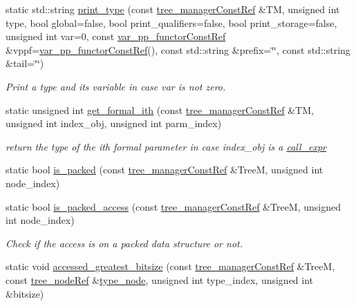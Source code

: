 \begin{DoxyCompactItemize}
static std\+::string \hyperlink{classtree__helper_ae3199a84c9560139e1bbbaf3b5b1e519}{print\+\_\+type} (const \hyperlink{tree__manager_8hpp_a792e3f1f892d7d997a8d8a4a12e39346}{tree\+\_\+manager\+Const\+Ref} \&TM, unsigned int type, bool global=false, bool print\+\_\+qualifiers=false, bool print\+\_\+storage=false, unsigned int var=0, const \hyperlink{var__pp__functor_8hpp_a8a6b51b6519401d911398943510557f0}{var\+\_\+pp\+\_\+functor\+Const\+Ref} \&vppf=\hyperlink{var__pp__functor_8hpp_a8a6b51b6519401d911398943510557f0}{var\+\_\+pp\+\_\+functor\+Const\+Ref}(), const std\+::string \&prefix=\char`\"{}\char`\"{}, const std\+::string \&tail=\char`\"{}\char`\"{})
\begin{DoxyCompactList}\small\item\em Print a type and its variable in case var is not zero. \end{DoxyCompactList}\item 
static unsigned int \hyperlink{classtree__helper_ab167a6cf8665fcf9f50a007f94dc0048}{get\+\_\+formal\+\_\+ith} (const \hyperlink{tree__manager_8hpp_a792e3f1f892d7d997a8d8a4a12e39346}{tree\+\_\+manager\+Const\+Ref} \&TM, unsigned int index\+\_\+obj, unsigned int parm\+\_\+index)
\begin{DoxyCompactList}\small\item\em return the type of the ith formal parameter in case index\+\_\+obj is a \hyperlink{structcall__expr}{call\+\_\+expr} \end{DoxyCompactList}\item 
static bool \hyperlink{classtree__helper_abc76c244562398090b0f0341d0f92dae}{is\+\_\+packed} (const \hyperlink{tree__manager_8hpp_a792e3f1f892d7d997a8d8a4a12e39346}{tree\+\_\+manager\+Const\+Ref} \&TreeM, unsigned int node\+\_\+index)
\item 
static bool \hyperlink{classtree__helper_ae706d20dd7fa5cc5d33649877084622b}{is\+\_\+packed\+\_\+access} (const \hyperlink{tree__manager_8hpp_a792e3f1f892d7d997a8d8a4a12e39346}{tree\+\_\+manager\+Const\+Ref} \&TreeM, unsigned int node\+\_\+index)
\begin{DoxyCompactList}\small\item\em Check if the access is on a packed data structure or not. \end{DoxyCompactList}\item 
static void \hyperlink{classtree__helper_a4bb90d532741ab00cea548b765e0f420}{accessed\+\_\+greatest\+\_\+bitsize} (const \hyperlink{tree__manager_8hpp_a792e3f1f892d7d997a8d8a4a12e39346}{tree\+\_\+manager\+Const\+Ref} \&TreeM, const \hyperlink{tree__node_8hpp_a6ee377554d1c4871ad66a337eaa67fd5}{tree\+\_\+node\+Ref} \&\hyperlink{structtype__node}{type\+\_\+node}, unsigned int type\+\_\+index, unsigned int \&bitsize)

\end{DoxyCompactItemize}
